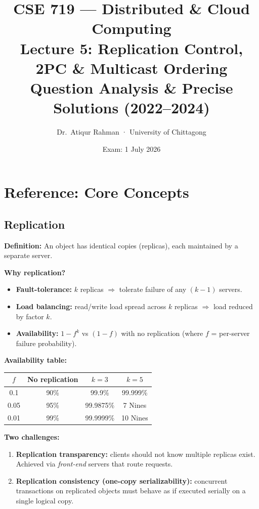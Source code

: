 \documentclass[12pt,a4paper]{article}
\title{\textbf{CSE 719 — Distributed \& Cloud Computing}\\
\large Lecture 5: Replication Control, 2PC \& Multicast Ordering\\
\normalsize Question Analysis \& Precise Solutions (2022–2024)}
\author{Dr.\ Atiqur Rahman · University of Chittagong}
\date{Exam: 1 July 2026}
\begin{document}
\maketitle
\tableofcontents
\newpage

\section{Reference: Core Concepts}

\subsection{Replication}
\textbf{Definition:} An object has identical copies (replicas), each maintained by a separate server.

\textbf{Why replication?}
\begin{itemize}
  \item \textbf{Fault-tolerance:} $k$ replicas $\Rightarrow$ tolerate failure of any $(k-1)$ servers.
  \item \textbf{Load balancing:} read/write load spread across $k$ replicas $\Rightarrow$ load reduced by factor $k$.
  \item \textbf{Availability:} $1 - f^k$ vs $(1-f)$ with no replication
        (where $f$ = per-server failure probability).
\end{itemize}

\textbf{Availability table:}
\begin{center}
\renewcommand{\arraystretch}{1.2}
\begin{tabular}{cccc}
\toprule
$f$ & No replication & $k=3$ & $k=5$ \\
\midrule
0.1 & 90\% & 99.9\% & 99.999\% \\
0.05 & 95\% & 99.9875\% & 7 Nines \\
0.01 & 99\% & 99.9999\% & 10 Nines \\
\bottomrule
\end{tabular}
\end{center}

\textbf{Two challenges:}
\begin{enumerate}
  \item \textbf{Replication transparency:} clients should not know multiple replicas exist.
        Achieved via \emph{front-end} servers that route requests.
  \item \textbf{Replication consistency (one-copy serializability):}
        concurrent transactions on replicated objects must behave as if executed serially
        on a single logical copy.
\end{enumerate}
\end{document}
